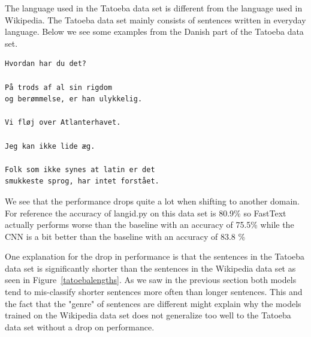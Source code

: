 The language used in the Tatoeba data set is different from the language used in Wikipedia. The Tatoeba data set mainly consists of sentences written in everyday language. Below we see some examples from the Danish part of the Tatoeba data set.
\begin{verbatim}
Hvordan har du det?

På trods af al sin rigdom
og berømmelse, er han ulykkelig.

Vi fløj over Atlanterhavet.

Jeg kan ikke lide æg.

Folk som ikke synes at latin er det
smukkeste sprog, har intet forstået.
\end{verbatim}



We see that the performance drops quite a lot when shifting to another domain. For reference the accuracy of langid.py on this data set is 80.9\% so FastText actually performs worse than the baseline with an accuracy of 75.5\% while the CNN is a bit better than the baseline with an accuracy of 83.8 \% 

One explanation for the drop in performance is that the sentences in the Tatoeba data set is significantly shorter than the sentences in the Wikipedia data set as seen in Figure~\ref{tatoebalengths}. As we saw in the previous section both models tend to mis-classify shorter sentences more often than longer sentences. This and the fact that the "genre" of sentences are different might explain why the models trained on the Wikipedia data set does not generalize too well to the Tatoeba data set without a drop on performance.

